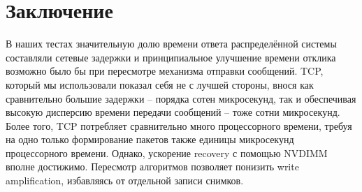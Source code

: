\documentclass[pdftex,ptm,12pt,a4paper]{report}
\theoremstyle{definition}
\begin{document}
\chapter{Заключение}
В наших тестах значительную долю времени ответа распределённой системы составляли сетевые задержки и принципиальное улучшение времени отклика возможно было бы при
пересмотре механизма отправки сообщений. TCP, который мы использовали показал себя не с лучшей стороны, внося как сравнительно большие задержки -- порядка сотен микросекунд, так
и обеспечивая высокую дисперсию времени передачи сообщений -- тоже сотни микросекунд. Более того, TCP потребляет сравнительно много процессорного времени, требуя на одно только
формирование пакетов также единицы микросекунд процессорного времени. Однако, ускорение recovery с помощью NVDIMM вполне достижимо.
Пересмотр алгоритмов позволяет понизить write amplification, избавляясь от отдельной записи снимков.




\end{document}
